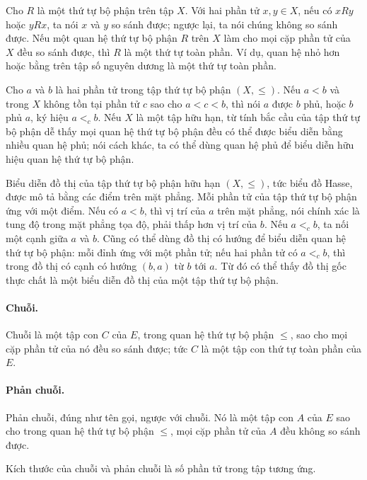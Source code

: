 \documentclass[11pt]{article}
\begin{document}
Cho \(R\) là một thứ tự bộ phận trên tập \(X\). Với hai phần tử \(x,y\in X\),
nếu có \(xRy\) hoặc \(yRx\), ta nói \(x\) và \(y\) so sánh được; ngược lại, ta
nói chúng không so sánh được. Nếu một quan hệ thứ tự bộ phận \(R\) trên \(X\)
làm cho mọi cặp phần tử của \(X\) đều so sánh được, thì \(R\) là một thứ tự
toàn phần. Ví dụ, quan hệ nhỏ hơn hoặc bằng trên tập số nguyên dương là một thứ
tự toàn phần.

Cho \(a\) và \(b\) là hai phần tử trong tập thứ tự bộ phận \((X,\le)\). Nếu
\(a<b\) và trong \(X\) không tồn tại phần tử \(c\) sao cho \(a<c<b\), thì nói
\(a\) được \(b\) phủ, hoặc \(b\) phủ \(a\), ký hiệu \(a<_c b\). Nếu \(X\) là
một tập hữu hạn, từ tính bắc cầu của tập thứ tự bộ phận dễ thấy mọi quan hệ
thứ tự bộ phận đều có thể được biểu diễn bằng nhiều quan hệ phủ; nói cách khác,
ta có thể dùng quan hệ phủ để biểu diễn hữu hiệu quan hệ thứ tự bộ phận.

Biểu diễn đồ thị của tập thứ tự bộ phận hữu hạn \((X,\le)\), tức biểu đồ
Hasse, được mô tả bằng các điểm trên mặt phẳng. Mỗi phần tử của tập thứ tự bộ
phận ứng với một điểm. Nếu có \(a<b\), thì vị trí của \(a\) trên mặt phẳng,
nói chính xác là tung độ trong mặt phẳng tọa độ, phải thấp hơn vị trí của
\(b\). Nếu \(a<_c b\), ta nối một cạnh giữa \(a\) và \(b\). Cũng có thể dùng
đồ thị có hướng để biểu diễn quan hệ thứ tự bộ phận: mỗi đỉnh ứng với một phần
tử; nếu hai phần tử có \(a<_c b\), thì trong đồ thị có cạnh có hướng
\((b,a)\) từ \(b\) tới \(a\). Từ đó có thể thấy đồ thị gốc thực chất là một
biểu diễn đồ thị của một tập thứ tự bộ phận.

\paragraph{Chuỗi.}
Chuỗi là một tập con \(C\) của \(E\), trong quan hệ thứ tự bộ phận \(\le\), sao
cho mọi cặp phần tử của nó đều so sánh được; tức \(C\) là một tập con thứ tự
toàn phần của \(E\).

\paragraph{Phản chuỗi.}
Phản chuỗi, đúng như tên gọi, ngược với chuỗi. Nó là một tập con \(A\) của
\(E\) sao cho trong quan hệ thứ tự bộ phận \(\le\), mọi cặp phần tử của \(A\)
đều không so sánh được.

Kích thước của chuỗi và phản chuỗi là số phần tử trong tập tương ứng.
\end{document}
